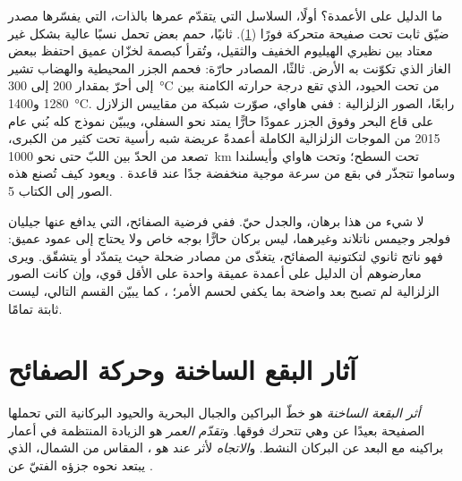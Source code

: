 ما الدليل على الأعمدة؟ أولًا، السلاسل التي يتقدّم عمرها بالذات، التي يفسّرها مصدر ضيّق ثابت تحت صفيحة متحركة فورًا (\cref{sec:b1:hotspots:tracks}). ثانيًا، حمم بعض  تحمل نسبًا عالية بشكل غير معتاد بين نظيري الهيليوم الخفيف والثقيل، وتُقرأ كبصمة لخزّان عميق احتفظ ببعض الغاز الذي تكوّنت به الأرض. ثالثًا، المصادر حارّة: فحمم الجزر المحيطية والهضاب تشير إلى  أحرّ بمقدار 200 إلى \qty{300}{\celsius} من  تحت الحيود، الذي تقع درجة حرارته الكامنة بين 1280 و\qty{1400}{\celsius}. رابعًا، الصور الزلزالية : ففي هاواي، صوّرت شبكة من مقاييس الزلازل على قاع البحر وفوق الجزر عمودًا حارًّا يمتد نحو  السفلي، ويبيّن نموذج  كله بُني عام 2015 من الموجات الزلزالية الكاملة أعمدةً عريضة شبه رأسية تحت كثير من  الكبرى، تصعد من الحدّ بين اللبّ  حتى نحو \qty{1000}{km} تحت السطح؛ وتحت هاواي وأيسلندا وساموا تتجذّر في بقع من سرعة موجية منخفضة جدًا عند قاعدة . ويعود كيف تُصنع هذه الصور إلى الكتاب 5.

لا شيء من هذا برهان، والجدل حيّ. ففي فرضية الصفائح، التي يدافع عنها جيليان فولجر وجيمس ناتلاند وغيرهما، ليس بركان  حارًّا بوجه خاص ولا يحتاج إلى عمود عميق: فهو ناتج ثانوي لتكتونية الصفائح، يتغذّى من مصادر ضحلة حيث يتمدّد  أو يتشقّق. ويرى معارضوهم أن الدليل على أعمدة عميقة واحدة على الأقل قوي، وإن كانت الصور الزلزالية لم تصبح بعد واضحة بما يكفي لحسم الأمر؛ ، كما يبيّن القسم التالي، ليست ثابتة تمامًا.

\section{آثار البقع الساخنة وحركة الصفائح}\label{sec:b1:hotspots:tracks}

\begin{definition}\label{def:b1:hotspots:track}
\emph{أثر البقعة الساخنة} هو خطّ البراكين والجبال البحرية والحيود البركانية التي تحملها الصفيحة بعيدًا عن  وهي تتحرك فوقها. و\emph{تقدّم العمر} هو الزيادة المنتظمة في أعمار براكينه مع البعد عن البركان النشط. و\emph{الاتجاه} لأثر عند  هو ، المقاس من الشمال، الذي يبتعد نحوه جزؤه الفتيّ عن .
\end{definition}

